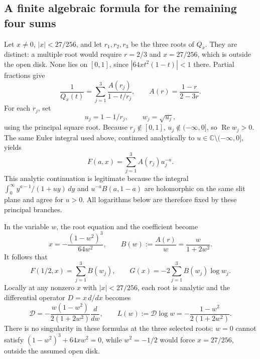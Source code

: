 \documentclass[11pt,a4paper]{article}
\theoremstyle{remark}\newtheorem{remark}[theorem]{Remark}
\numberwithin{equation}{section}
\begin{document}
\subsection{A finite algebraic formula for the remaining four sums}
Let $x\ne0$, $|x|<27/256$, and let $r_1,r_2,r_3$ be the three
roots of $Q_x$. They are distinct: a multiple root would require
$r=2/3$ and $x=27/256$, which is outside the open disk. None lies
on $[0,1]$, since $|64xt^2(1-t)|<1$ there. Partial fractions give
\begin{equation}
 \frac1{Q_x(t)}=\sum_{j=1}^3\frac{A(r_j)}{1-t/r_j},
 \qquad A(r)=\frac{1-r}{2-3r}.
 \label{eq:beta-partial}
\end{equation}
For each $r_j$, set
\[
 u_j=1-1/r_j,\qquad w_j=\sqrt{u_j},
\]
using the principal square root. Because $r_j\notin[0,1]$,
$u_j\notin(-\infty,0]$, so $\operatorname{Re}w_j>0$.
The same Euler integral used above, continued analytically to
$u\in\mathbb C\setminus(-\infty,0]$, yields
\begin{equation}
 F(a,x)=\sum_{j=1}^3 A(r_j)u_j^{-a}.
 \label{eq:beta-F-roots}
\end{equation}
This analytic continuation is legitimate because the integral
$\int_0^\infty y^{a-1}/(1+uy)\,dy$ and $u^{-a}B(a,1-a)$
are holomorphic on the same slit plane and agree for $u>0$.
All logarithms below are therefore fixed by these principal branches.

In the variable $w$, the root equation and the coefficient become
\begin{equation}
 x=-\frac{(1-w^2)^3}{64w^2},\qquad
 B(w):=\frac{A(r)}w=\frac{w}{1+2w^2}.
 \label{eq:beta-w}
\end{equation}
It follows that
\begin{equation}
 F(1/2,x)=\sum_{j=1}^3B(w_j),\qquad
 G(x)=-2\sum_{j=1}^3B(w_j)\log w_j.
 \label{eq:beta-root-sums}
\end{equation}
Locally at any nonzero $x$ with $|x|<27/256$, each root is analytic
and the differential operator $D=x\,d/dx$ becomes
\begin{equation}
 \mathcal D=-\frac{w(1-w^2)}{2(1+2w^2)}\frac d{dw},
 \qquad L(w):=\mathcal D\log w
 =-\frac{1-w^2}{2(1+2w^2)}.
 \label{eq:beta-D}
\end{equation}
There is no singularity in these formulas at the three selected roots:
$w=0$ cannot satisfy $(1-w^2)^3+64xw^2=0$, while $w^2=-1/2$
would force $x=27/256$, outside the assumed open disk.
\end{document}
